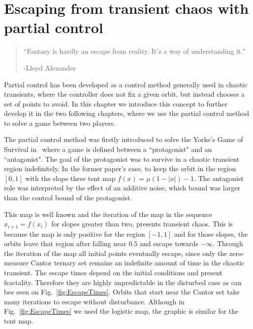 \chapter{Escaping from transient chaos with partial control} %
\label{chap:ForcingEscape}


\begin{quotation}
	\vspace{-3cm}
    \begin{flushright}
    \begin{minipage}[t][5cm][b]{0.5\textwidth}
    { ``Fantasy is hardly an escape from reality. It's a way of understanding it."}
    
    \bigskip
    
    -{\small  Lloyd Alexander}
    \end{minipage}
    \end{flushright}
    
    \vspace{0.5cm}
\end{quotation}




Partial control has been developed as a control method generally used in chaotic transients, where the controller does not fix a given orbit, but instead chooses a set of points to avoid. In this chapter we introduce this concept to further develop it in the two following chapters, where we use the partial control method to solve a game between two players. 

The partial control method was firstly introduced to solve the Yorke's Game of Survival in~\cite{Yorke'sGame} where a game is defined between a ``protagonist" and an ``antagonist". The goal of the protagonist was to survive in a chaotic transient region indefinitely. In the former paper's case, to keep the orbit in the region $[0,1]$ with the slope three tent map $f(x) = \mu(1-|x|)-1$. The antagonist role was interpreted by the effect of an additive noise, which bound was larger than the control bound of the protagonist.

This map is well known and the iteration of the map in the sequence $x_{i+1} = f(x_i)$ for slopes greater than two, presents transient chaos. This is because the map is only positive for the region $[-1,1]$ and for those slopes, the orbits leave that region after falling near $0.5$ and escape towards $-\infty$. Through the iteration of the map all initial points eventually escape, since only the zero-measure Cantor ternary set remains an indefinite amount of time in the chaotic transient. The escape times depend on the initial conditions and present fractality. Therefore they are highly unpredictable in the disturbed case as can bee seen on Fig.~\ref{fig:EscapeTimes}. Orbits that start near the Cantor set take many iterations to escape without disturbance. Although in Fig.~\ref{fig:EscapeTimes} we used the logistic map, the graphic is similar for the tent map.

